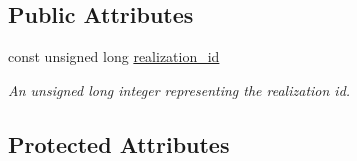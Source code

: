 \subsection*{Public Attributes}
\begin{DoxyCompactItemize}
\item 
const unsigned long \mbox{\hyperlink{classContinuityModel_a7b6c99bf256f6c6b633ebb78282f43c7}{realization\+\_\+id}}
\begin{DoxyCompactList}\small\item\em An unsigned long integer representing the realization id. \end{DoxyCompactList}\end{DoxyCompactItemize}
\subsection*{Protected Attributes}
